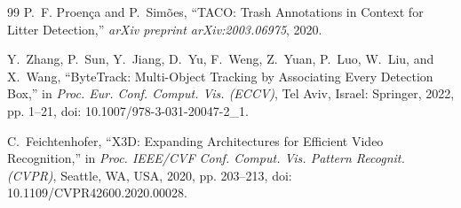 \documentclass[conference]{IEEEtran}
\begin{document}
\begin{thebibliography}{99}
P.~F. Proen\c{c}a and P.~Sim\~{o}es,
``TACO: Trash Annotations in Context for Litter Detection,''
\textit{arXiv preprint arXiv:2003.06975}, 2020.

Y.~Zhang, P.~Sun, Y.~Jiang, D.~Yu, F.~Weng, Z.~Yuan, P.~Luo, W.~Liu, and X.~Wang,
``ByteTrack: Multi-Object Tracking by Associating Every Detection Box,''
in \textit{Proc. Eur. Conf. Comput. Vis. (ECCV)},
Tel Aviv, Israel: Springer, 2022, pp. 1--21, doi: 10.1007/978-3-031-20047-2\_1.

C.~Feichtenhofer,
``X3D: Expanding Architectures for Efficient Video Recognition,''
in \textit{Proc. IEEE/CVF Conf. Comput. Vis. Pattern Recognit. (CVPR)},
Seattle, WA, USA, 2020, pp. 203--213, doi: 10.1109/CVPR42600.2020.00028.

\end{thebibliography}
\end{document}
